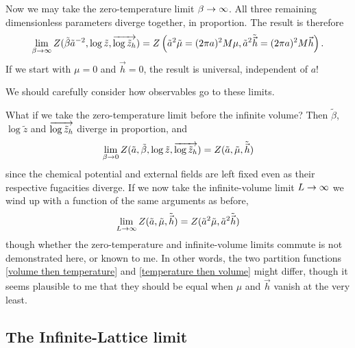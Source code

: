 Now we may take the zero-temperature limit $\beta\rightarrow\infty$.
All three remaining dimensionless parameters diverge together, in proportion.
The result is therefore
\begin{align}
    \lim_{\beta\rightarrow\infty} Z(\tilde{\beta}\tilde{a}^{-2}, \log\tilde{z}, \overrightarrow{\log \tilde{z}_h})
    =
    Z\left( \tilde{a}^2\tilde{\mu} = (2\pi a)^2 M \mu, \tilde{a}^2 \tilde{\vec{h}} = (2\pi a)^2 M \vec{h} \right).
    \label{eq:volume then temperature}
\end{align}
If we start with $\mu=0$ and $\vec{h}=0$, the result is universal, independent of $a$!

We should carefully consider how observables go to these limits.

What if we take the zero-temperature limit before the infinite volume?
Then $\tilde{\beta}$, $\log\tilde{z}$ and $\overrightarrow{\log\tilde{z}_h}$ diverge in proportion, and 
\begin{align}
    \lim_{\beta\rightarrow0} Z(\tilde{a}, \tilde{\beta}, \log\tilde{z}, \overrightarrow{\log \tilde{z}_h})
    =
    Z(\tilde{a}, \tilde{\mu}, \tilde{\vec{h}})
\end{align}
since the chemical potential and external fields are left fixed even as their respective fugacities diverge.
If we now take the infinite-volume limit $L\rightarrow\infty$ we wind up with a function of the same arguments as before,
\begin{align}
    \lim_{L\rightarrow\infty}
    Z(\tilde{a}, \tilde{\mu}, \tilde{\vec{h}})
    =
    Z( \tilde{a}^2\tilde{\mu}, \tilde{a}^2 \tilde{\vec{h}} )
    \label{eq:temperature then volume}
\end{align}
though whether the zero-temperature and infinite-volume limits commute is not demonstrated here, or known to me.
In other words, the two partition functions \eqref{volume then temperature} and \eqref{temperature then volume} might differ, though it seems plausible to me that they should be equal when $\mu$ and $\vec{h}$ vanish at the very least.

\subsection{The Infinite-Lattice limit}

